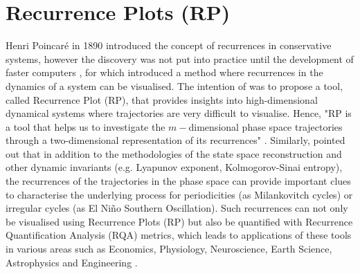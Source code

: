\section{Recurrence Plots (RP)}
Henri Poincar\'e in 1890 introduced the concept of recurrences in 
conservative systems, however the discovery was not put into practice until 
the development of faster computers \citep{marwan2007}, for which 
\cite{eckmann1987} introduced a method where recurrences in the dynamics of 
a system can be visualised.
The intention of \cite{eckmann1987}  was to propose a tool,
called Recurrence Plot (RP), that provides insights into high-dimensional 
dynamical systems where trajectories are very difficult to visualise.
Hence, "RP is a tool that helps us to investigate the 
$m-$dimensional phase space trajectories through a two-dimensional 
representation of its recurrences" \citep[p. 7]{marwan2015}.
Similarly, \cite{marwan2015} pointed out that in addition to the 
methodologies of the state space reconstruction and other dynamic invariants 
(e.g. Lyapunov exponent, Kolmogorov-Sinai entropy), the recurrences of the 
trajectories in the phase space can provide important clues to characterise 
the underlying process for periodicities (as Milankovitch cycles) or 
irregular cycles (as El Ni\~no Southern Oscillation). 
Such recurrences can not only be visualised using Recurrence Plots (RP) 
but also be quantified with Recurrence Quantification Analysis (RQA) metrics, 
which leads to applications of these tools in various areas such as Economics, 
Physiology, Neuroscience, Earth Science, Astrophysics and Engineering 
\citep{marwan2007}.

